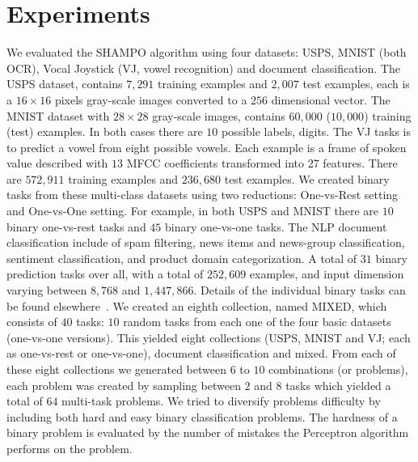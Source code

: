 \chapter{Experiments}




We evaluated the SHAMPO algorithm using four datasets: USPS, MNIST (both OCR), Vocal Joystick 
(VJ, vowel recognition) and document classification. 
The USPS dataset, contains $7,291$ training examples and $2,007$ test examples, each is a 
$16\times16$ pixels gray-scale images converted to a $256$ dimensional vector. 
The MNIST dataset with $28\times28$ gray-scale images, contains $60,000$ ($10,000$) training (test) 
examples. In both cases there are $10$ possible labels, digits. The VJ tasks is to predict a vowel from 
eight possible vowels. Each example is a frame of spoken value described with $13$ MFCC coefficients 
transformed into 27 features. There are $572,911$ training examples and $236,680$ test examples. 
We created binary tasks from these multi-class datasets using two reductions: One-vs-Rest setting and 
One-vs-One setting. For example, in both USPS and MNIST there are $10$ binary one-vs-rest tasks and 
$45$ binary one-vs-one tasks.  The NLP document classification include of spam filtering, news items and 
news-group classification, sentiment classification, and product domain categorization. 
A total of $31$ binary prediction tasks over all, with a total of $252,609$ examples, and input dimension 
varying between $8,768$ and $1,447,866$. Details of the individual binary tasks can be found 
elsewhere~\cite{Crammer:2012:CLC:2343676.2343704}.  We created an eighth collection, named MIXED, 
which consists of $40$ tasks: $10$ random tasks from each one of the four basic datasets 
(one-vs-one versions).
This yielded eight collections (USPS, MNIST and VJ; each as one-vs-rest or one-vs-one), document 
classification and mixed.  From each of these eight collections we generated between $6$ to $10$ 
combinations (or problems), each problem was created by sampling between $2$ and $8$ tasks which 
yielded a total of $64$ multi-task problems. We tried to diversify problems difficulty by including both 
hard and easy binary classification problems. The hardness of a binary problem is evaluated by the number 
of mistakes the Perceptron algorithm performs on the problem.

